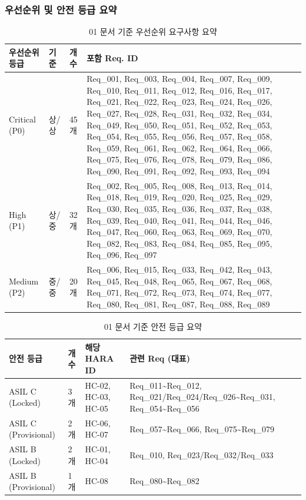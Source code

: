 \documentclass[11pt,a4paper]{article}
\begin{document}
\subsubsection{우선순위 및 안전 등급 요약}
\begin{table}[H]
\centering
\begin{tabularx}{\textwidth}{|p{28mm}|p{26mm}|p{18mm}|X|}
\hline
\textbf{우선순위 등급} & \textbf{기준} & \textbf{개수} & \textbf{포함 Req. ID} \\ \hline
Critical (P0) & 상/상 & 45개 & Req\_001, Req\_003, Req\_004, Req\_007, Req\_009, Req\_010, Req\_011, Req\_012, Req\_016, Req\_017, Req\_021, Req\_022, Req\_023, Req\_024, Req\_026, Req\_027, Req\_028, Req\_031, Req\_032, Req\_034, Req\_049, Req\_050, Req\_051, Req\_052, Req\_053, Req\_054, Req\_055, Req\_056, Req\_057, Req\_058, Req\_059, Req\_061, Req\_062, Req\_064, Req\_066, Req\_075, Req\_076, Req\_078, Req\_079, Req\_086, Req\_090, Req\_091, Req\_092, Req\_093, Req\_094 \\ \hline
High (P1) & 상/중 & 32개 & Req\_002, Req\_005, Req\_008, Req\_013, Req\_014, Req\_018, Req\_019, Req\_020, Req\_025, Req\_029, Req\_030, Req\_035, Req\_036, Req\_037, Req\_038, Req\_039, Req\_040, Req\_041, Req\_044, Req\_046, Req\_047, Req\_060, Req\_063, Req\_069, Req\_070, Req\_082, Req\_083, Req\_084, Req\_085, Req\_095, Req\_096, Req\_097 \\ \hline
Medium (P2) & 중/중 & 20개 & Req\_006, Req\_015, Req\_033, Req\_042, Req\_043, Req\_045, Req\_048, Req\_065, Req\_067, Req\_068, Req\_071, Req\_072, Req\_073, Req\_074, Req\_077, Req\_080, Req\_081, Req\_087, Req\_088, Req\_089 \\ \hline
\end{tabularx}
\caption{01 문서 기준 우선순위 요구사항 요약}
\end{table}

\begin{table}[H]
\centering
\begin{tabularx}{\textwidth}{|p{34mm}|p{18mm}|p{34mm}|X|}
\hline
\textbf{안전 등급} & \textbf{개수} & \textbf{해당 HARA ID} & \textbf{관련 Req (대표)} \\ \hline
ASIL C (Locked) & 3개 & HC-02, HC-03, HC-05 & Req\_011\textasciitilde Req\_012, Req\_021/Req\_024/Req\_026\textasciitilde Req\_031, Req\_054\textasciitilde Req\_056 \\ \hline
ASIL C (Provisional) & 2개 & HC-06, HC-07 & Req\_057\textasciitilde Req\_066, Req\_075\textasciitilde Req\_079 \\ \hline
ASIL B (Locked) & 2개 & HC-01, HC-04 & Req\_010, Req\_023/Req\_032/Req\_033 \\ \hline
ASIL B (Provisional) & 1개 & HC-08 & Req\_080\textasciitilde Req\_082 \\ \hline
\end{tabularx}
\caption{01 문서 기준 안전 등급 요약}
\end{table}
\end{document}

